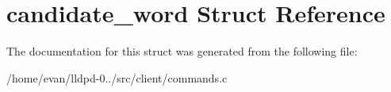 \section{candidate\-\_\-word \-Struct \-Reference}
\label{structcandidate__word}


\-The documentation for this struct was generated from the following file\-:\begin{DoxyCompactItemize}
\item 
/home/evan/lldpd-\/0../src/client/commands.\-c\end{DoxyCompactItemize}
